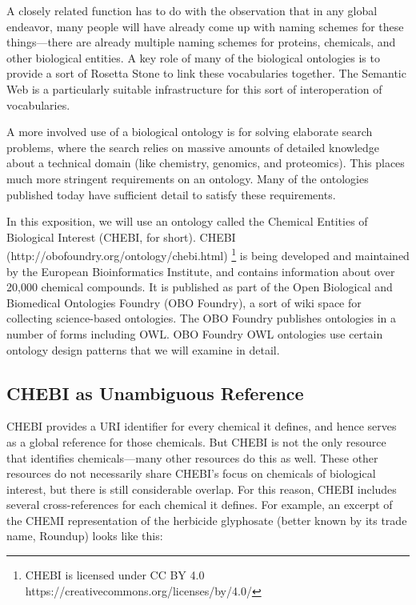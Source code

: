 A closely related function has to do with the observation that in any
global endeavor, many people will have already come up with naming
schemes for these things---there are already multiple naming schemes for
proteins, chemicals, and other biological entities. A key role of many
of the biological ontologies is to provide a sort of Rosetta Stone to
link these vocabularies together. The Semantic Web is a particularly
suitable infrastructure for this sort of interoperation of vocabularies.

A more involved use of a biological ontology is for solving elaborate
search problems, where the search relies on massive amounts of detailed
knowledge about a technical domain (like chemistry, genomics, and
proteomics). This places much more stringent requirements on an
ontology. Many of the ontologies published today have sufficient detail
to satisfy these requirements.

In this exposition, we will use an ontology called the Chemical Entities
of Biological Interest (CHEBI, for short). CHEBI \cite{PMID:26467479} (http://obofoundry.org/ontology/chebi.html) \footnote{CHEBI is licensed under CC BY 4.0 https://creativecommons.org/licenses/by/4.0/} is being developed and
maintained by the European Bioinformatics Institute, and contains
information about over 20,000 chemical compounds. It is published as
part of the Open Biological and Biomedical Ontologies Foundry (OBO
Foundry), a sort of wiki space for collecting science-based ontologies.
The OBO Foundry publishes ontologies in a number of forms including OWL.
OBO Foundry OWL ontologies use certain ontology design patterns that we
will examine in detail.

\subsection{CHEBI as Unambiguous Reference}

CHEBI provides a URI identifier for every chemical it defines, and hence
serves as a global reference for those chemicals. But CHEBI is not the
only resource that identifies chemicals---many other
resources do this as well. These other resources do not necessarily
share CHEBI's focus on chemicals of biological interest, but there is
still considerable overlap. For this reason, CHEBI includes several
cross-references for each chemical it defines. For example, an excerpt of the 
CHEMI representation of the
herbicide glyphosate (better known by its trade name, Roundup) looks like this: 

